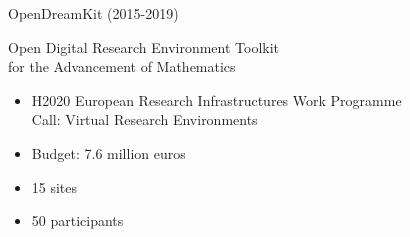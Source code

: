 \documentclass[
  usenames,svgnames, %
  compress,
  ]{beamer}
\begin{document}
\begin{frame}{OpenDreamKit (2015-2019)}
  \begin{block}{Open Digital Research Environment Toolkit\\
    for the Advancement of Mathematics}
    \begin{itemize}
    \item H2020 European Research Infrastructures Work
      Programme\\
      Call: Virtual Research Environments
    \item Budget: 7.6 million euros
    \item 15 sites
    \item 50 participants
    \end{itemize}
  \end{block}
\end{frame}
\end{document}
